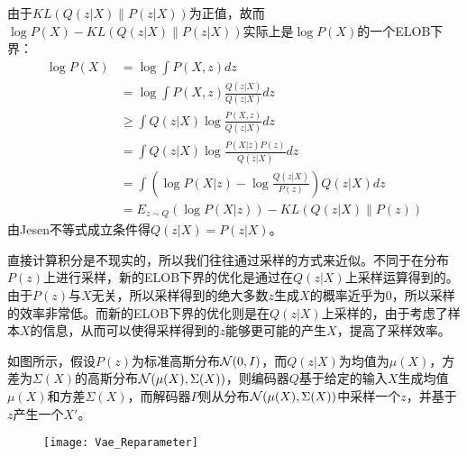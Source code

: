 由于$KL(Q(z|X)\|P(z|X))$为正值，故而$\log P(X) - KL(Q(z|X)\|P(z|X))$实际上是$\log P(X)$的一个ELOB下界：
\begin{displaymath}
\begin{split}
\log P(X) &= \log \int{P(X,z)}dz\\
&= \log \int{P(X,z)}\frac{Q(z|X)}{Q(z|X)} dz\\
&\geq \int{ Q(z|X) \log {\frac{P(X,z)}{Q(z|X)}} dz}\\
&= \int{ Q(z|X) \log {\frac{P(X|z)P(z)}{Q(z|X)}} dz}\\
&= \int{(\log P(X|z) - \log \frac{Q(z|X)}{P(z)})Q(z|X)dz}\\
&= E_{z \sim Q}(\log {P(X|z)}) -KL(Q(z|X) \| P(z))
\end{split}
\end{displaymath} 
由Jesen不等式成立条件得$Q(z|X) = P(z|X)$。

直接计算积分是不现实的，所以我们往往通过采样的方式来近似。不同于在分布$P(z)$上进行采样，新的ELOB下界的优化是通过在$Q(z|X)$上采样运算得到的。由于$P(z)$与$X$无关，所以采样得到的绝大多数$z$生成$X$的概率近乎为0，所以采样的效率非常低。而新的ELOB下界的优化则是在$Q(z|X)$上采样的，由于考虑了样本$X$的信息，从而可以使得采样得到的$z$能够更可能的产生$X$，提高了采样效率。

如图所示，假设$P(z)$为标准高斯分布${\cal{N}}(0,I)$，而$Q(z|X)$为均值为$\mu(X)$，方差为$\Sigma(X)$的高斯分布${\cal{N}}(\mu(X),\Sigma(X))$，则编码器$Q$基于给定的输入$X$生成均值$\mu(X)$和方差$\Sigma(X)$，而解码器$P$则从分布${\cal{N}}(\mu(X),\Sigma(X))$中采样一个$z$，并基于$z$产生一个$X'$。

\begin{figure}[htbp]
\centering
\texttt{[image: Vae\_Reparameter]}
\end{figure}
